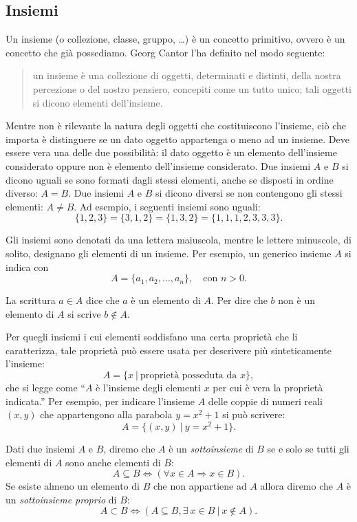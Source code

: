 \subsection*{Insiemi}\label{cap:insiemi}

Un insieme (o collezione, classe, gruppo, \dots) è un concetto primitivo, ovvero è un concetto che già possediamo. Georg Cantor l'ha definito nel modo seguente: 
\begin{quote}
un insieme è una collezione di oggetti, determinati e distinti, della nostra percezione o del nostro pensiero, concepiti come un tutto unico; tali oggetti si dicono elementi dell'insieme.
\end{quote}
Mentre non è rilevante la natura degli oggetti che costituiscono l'insieme,  ciò che importa è distinguere se un dato oggetto appartenga o meno ad un insieme. Deve essere vera una delle due possibilità: il dato oggetto è un elemento dell'insieme considerato oppure non è elemento dell'insieme considerato.
Due insiemi $A$ e $B$ si dicono uguali se sono formati dagli stessi elementi, anche se disposti in ordine diverso: $A=B$. Due insiemi $A$ e $B$ si dicono diversi se non contengono gli stessi elementi:  $A \neq B$. Ad esempio, i seguenti insiemi sono uguali:
\[
\{1, 2, 3\} = \{3, 1, 2\} = \{1, 3, 2\}= \{1, 1, 1, 2, 3, 3, 3\}.
\]

Gli insiemi sono denotati da una lettera maiuscola, mentre le lettere minuscole, di solito, designano gli elementi di un insieme. 
Per esempio, un generico insieme $A$ si indica con
\[
A = \{a_1, a_2, \dots, a_n\}, \quad \text{con~} n > 0.
\]

La scrittura $a \in A$ dice che $a$ è un elemento di $A$. Per dire che  $b$ non è un elemento di $A$ si scrive $b \notin A.$

Per quegli insiemi i cui elementi soddisfano una certa proprietà che li caratterizza,
tale proprietà può essere usata per descrivere più sinteticamente l'insieme:
\[
A = \{x ~\vert~ \text{proprietà posseduta da~} x\},
\]
che si legge come ``$A$ è l'insieme degli elementi $x$ per cui è vera la proprietà indicata.'' Per esempio, per indicare l'insieme $A$ delle coppie di numeri reali $(x,y)$ che appartengono alla parabola $y = x^2 + 1$ si può scrivere:
\[
A = \{(x,y) ~\vert~ y = x^2 + 1\}.
\]

Dati due insiemi $A$ e $B$, diremo che $A$ è un \emph{sottoinsieme} di $B$ se e solo se tutti gli elementi di $A$ sono anche elementi di $B$:
\[
A \subseteq B \iff (\forall x \in A \Rightarrow x \in B).
\]
Se esiste almeno un elemento di $B$ che non appartiene ad $A$ allora diremo
che $A$ è un \emph{sottoinsieme proprio} di $B$:
\[
A \subset B \iff (A \subseteq B, \exists~ x \in B ~\vert~ x \notin A).
\]

